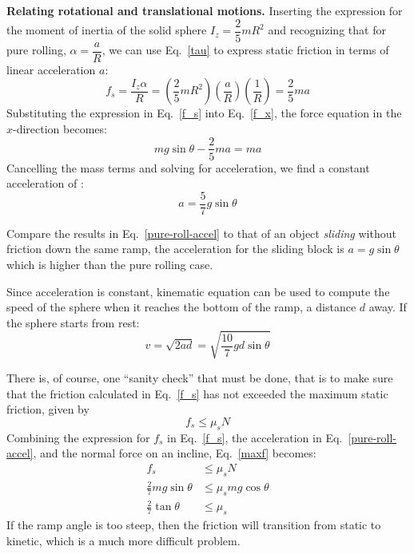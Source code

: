 \documentclass{../../oss-handout}
\begin{document}
\textbf{Relating rotational and translational motions.} Inserting the
expression for the moment of inertia of the solid sphere $I_z=\dfrac25 mR^2$
and recognizing that for pure rolling, $\alpha=\dfrac aR$, we can use
Eq.~\ref{tau} to express static friction in terms of linear acceleration $a$:
\begin{equation}
  f_s=\frac{I_z\alpha}{R}=
  \left(\frac25 mR^2\right)
  \left(\frac{a}{R}\right)
  \left(\frac{1}{R}\right)=\frac25ma
  \label{f_s}
\end{equation}
Substituting the expression in Eq.~\ref{f_s} into Eq.~\ref{f_x}, the force
equation in the $x$-direction becomes:
\begin{equation}
  mg\sin\theta-\frac25 ma=ma
\end{equation}
Cancelling the mass terms and solving for acceleration, we find a constant
acceleration of :
\begin{equation}
  a=\frac57 g\sin\theta
  \label{pure-roll-accel}
\end{equation}

Compare the results in Eq.~\ref{pure-roll-accel} to that of an object
\emph{sliding} without friction down the same ramp, the acceleration for the
sliding block is $a=g\sin\theta$ which is higher than the pure rolling case.

Since acceleration is constant, kinematic equation can be used to compute the
speed of the sphere when it reaches the bottom of the ramp, a distance $d$ away.
If the sphere starts from rest:
\begin{equation}
  v=\sqrt{2ad}=\sqrt{\frac{10}{7}gd\sin\theta}
\end{equation}

There is, of course, one ``sanity check'' that must be done, that is to make
sure that the friction calculated in Eq.~\ref{f_s} has not exceeded the maximum
static friction, given by
\begin{equation}
  f_s\leq\mu_s N
  \label{maxf}
\end{equation}
Combining the expression for $f_s$ in Eq.~\ref{f_s}, the acceleration in
Eq.~\ref{pure-roll-accel}, and the normal force on an incline, Eq.~\ref{maxf}
becomes:
\begin{align}
  f_s&\leq\mu_sN\\
  \frac27mg\sin\theta&\leq\mu_smg\cos\theta\\
  \frac27\tan\theta&\leq\mu_s
\end{align}
If the ramp angle is too steep, then the friction will transition from static
to kinetic, which is a much more difficult problem.
\end{document}
